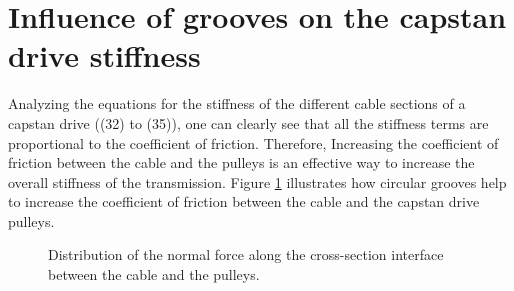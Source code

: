 \section{Influence of grooves on the capstan drive stiffness}
 Analyzing the equations for the stiffness of the different cable sections of a capstan drive ((32) to (35)), one can clearly see that all the stiffness terms are proportional to the coefficient of friction. Therefore, Increasing the coefficient of friction between the cable and the pulleys is an effective way to increase the overall stiffness of the transmission. Figure \ref{fig:distib_force} illustrates how circular grooves help to increase the coefficient of friction between the cable and the capstan drive pulleys.\\
 \begin{figure}
    \centering
    
    \caption{Distribution of the normal force along the cross-section interface between the cable and the pulleys.}
    \label{fig:distib_force}
\end{figure}
